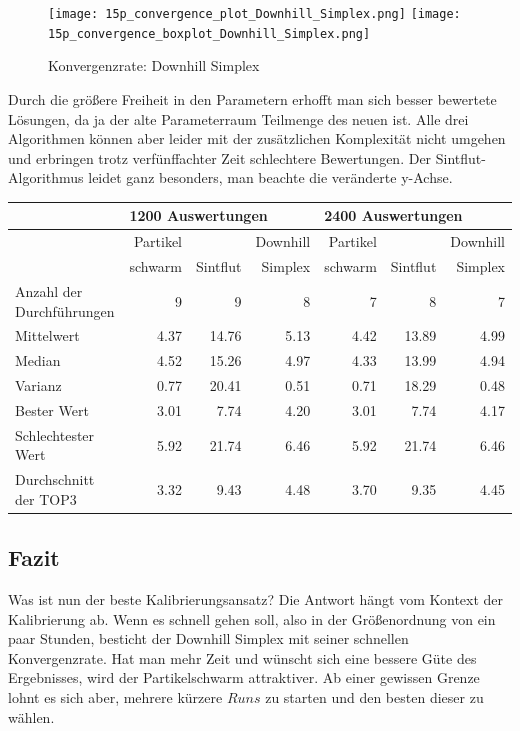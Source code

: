 \documentclass[a4paper,12pt]{article}
\begin{document}
\begin{figure}[h]
\texttt{[image: 15p\_convergence\_plot\_Downhill\_Simplex.png]}
\texttt{[image: 15p\_convergence\_boxplot\_Downhill\_Simplex.png]}
\caption{Konvergenzrate: Downhill Simplex}
\end{figure}


Durch die größere Freiheit in den Parametern erhofft man sich besser bewertete Lösungen, da ja der alte Parameterraum Teilmenge des neuen ist. Alle drei Algorithmen können aber leider mit der zusätzlichen Komplexität nicht umgehen und erbringen trotz verfünffachter Zeit schlechtere Bewertungen. Der Sintflut-Algorithmus leidet ganz besonders, man beachte die veränderte y-Achse.

\begin{center}
\begin{tabular}{| l || r | r | r || r | r | r ||}
\hline
        & \multicolumn{3}{l||}{1200 Auswertungen} & \multicolumn{3}{l||}{2400 Auswertungen} \\ \hline
        & Partikel &          & Downhill & Partikel &          & Downhill\\ 
        & schwarm  & Sintflut & Simplex  & schwarm  & Sintflut & Simplex\\ \hline
Anzahl der Durchführungen  & 9 & 9 & 8 & 7 & 8 & 7 \\ \hline
Mittelwert                 & 4.37 & 14.76 & 5.13 & 4.42 & 13.89 & 4.99 \\ \hline
Median                     & 4.52 & 15.26 & 4.97 & 4.33 & 13.99 & 4.94 \\ \hline
Varianz                    & 0.77 & 20.41 & 0.51 & 0.71 & 18.29 & 0.48 \\ \hline
Bester Wert                & 3.01 &  7.74 & 4.20 & 3.01 &  7.74 & 4.17 \\ \hline
Schlechtester Wert         & 5.92 & 21.74 & 6.46 & 5.92 & 21.74 & 6.46 \\ \hline
Durchschnitt der TOP3      & 3.32 &  9.43 & 4.48 & 3.70 &  9.35 & 4.45 \\ \hline
\end{tabular}
\end{center}

\subsection{Fazit}

Was ist nun der beste Kalibrierungsansatz? Die Antwort hängt vom Kontext der Kalibrierung ab. Wenn es schnell gehen soll, also in der Größenordnung von ein paar Stunden, besticht der Downhill Simplex mit seiner schnellen Konvergenzrate. Hat man mehr Zeit und wünscht sich eine bessere Güte des Ergebnisses, wird der Partikelschwarm attraktiver. Ab einer gewissen Grenze lohnt es sich aber, mehrere kürzere $Runs$ zu starten und den besten dieser zu wählen.
\end{document}
